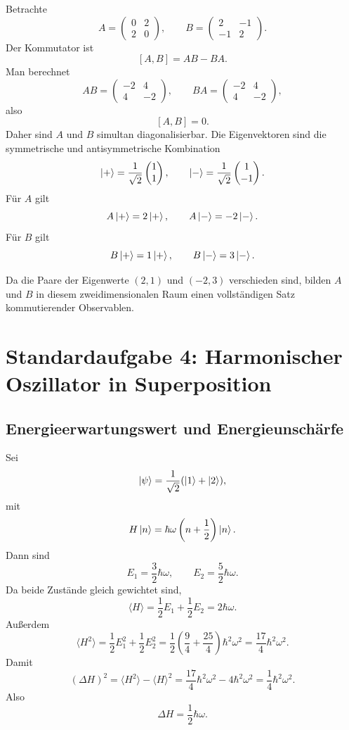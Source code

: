 Betrachte
\[
    A=\begin{pmatrix}0&2\\2&0\end{pmatrix},
    \qquad
    B=\begin{pmatrix}2&-1\\-1&2\end{pmatrix}.
\]
Der Kommutator ist
\[
    [A,B]=AB-BA.
\]
Man berechnet
\[
    AB=\begin{pmatrix}-2&4\\4&-2\end{pmatrix},
    \qquad
    BA=\begin{pmatrix}-2&4\\4&-2\end{pmatrix},
\]
also
\[
    [A,B]=0.
\]
Daher sind $A$ und $B$ simultan diagonalisierbar. Die Eigenvektoren sind die symmetrische und antisymmetrische Kombination
\[
    \left|+\right\rangle=\frac{1}{\sqrt2}\begin{pmatrix}1\\1\end{pmatrix},
    \qquad
    \left|-\right\rangle=\frac{1}{\sqrt2}\begin{pmatrix}1\\-1\end{pmatrix}.
\]
Für $A$ gilt
\[
    A\left|+\right\rangle=2\left|+\right\rangle,
    \qquad
    A\left|-\right\rangle=-2\left|-\right\rangle.
\]
Für $B$ gilt
\[
    B\left|+\right\rangle=1\left|+\right\rangle,
    \qquad
    B\left|-\right\rangle=3\left|-\right\rangle.
\]

\begin{answerbox}
Da die Paare der Eigenwerte $(2,1)$ und $(-2,3)$ verschieden sind, bilden $A$ und $B$ in diesem zweidimensionalen Raum einen vollständigen Satz kommutierender Observablen.
\end{answerbox}

\section{Standardaufgabe 4: Harmonischer Oszillator in Superposition}

\subsection{Energieerwartungswert und Energieunschärfe}

Sei
\[
    \left|\psi\right\rangle=\frac{1}{\sqrt2}(\left|1\right\rangle+\left|2\right\rangle),
\]
mit
\[
    H\left|n\right\rangle=\hbar\omega\left(n+\frac12\right)\left|n\right\rangle.
\]
Dann sind
\[
    E_1=\frac32\hbar\omega,
    \qquad
    E_2=\frac52\hbar\omega.
\]
Da beide Zustände gleich gewichtet sind,
\[
    \langle H\rangle=\frac12E_1+\frac12E_2=2\hbar\omega.
\]
Außerdem
\[
    \langle H^2\rangle=\frac12E_1^2+\frac12E_2^2
    =\frac12\left(\frac{9}{4}+\frac{25}{4}\right)\hbar^2\omega^2
    =\frac{17}{4}\hbar^2\omega^2.
\]
Damit
\[
    (\Delta H)^2=\langle H^2\rangle-\langle H\rangle^2
    =\frac{17}{4}\hbar^2\omega^2-4\hbar^2\omega^2
    =\frac14\hbar^2\omega^2.
\]
Also
\[
    \Delta H=\frac12\hbar\omega.
\]

